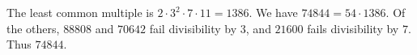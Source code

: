 The least common multiple is $2\cdot3^2\cdot7\cdot11=1386$. We have $74844=54\cdot1386$. Of the others, $88808$ and $70642$ fail divisibility by $3$, and $21600$ fails divisibility by $7$. Thus $\boxed{74844}$.
